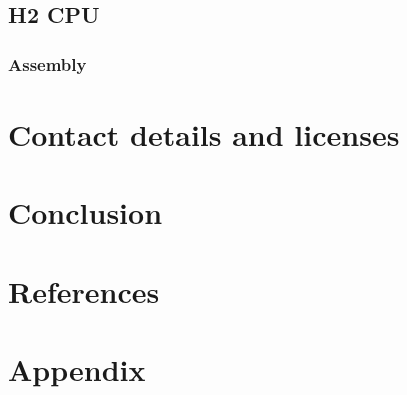 \documentclass	[a4paper, 10pt]	{article}
\begin{document}
    \subsection{H2 CPU}
      \subsubsection{Assembly}
  
  \section{Contact details and licenses}
  \section{Conclusion}
  \section{References}
  \section{Appendix}
\end{document}
